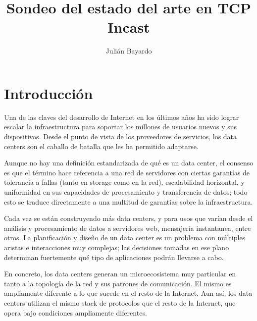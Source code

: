 \documentclass[runningheads,a4paper]{llncs}
\newcommand{\keywords}[1]{\par\addvspace\baselineskip
\noindent\keywordname\enspace\ignorespaces#1}
\begin{document}
\mainmatter  %

\title{Sondeo del estado del arte en TCP Incast}

\author{Julián Bayardo}


\maketitle



\section{Introducción}

Una de las claves del desarrollo de Internet en los últimos años ha sido lograr escalar la infraestructura para soportar los millones de usuarios nuevos y sus dispositivos. Desde el punto de vista de los proveedores de servicios, los data centers son el caballo de batalla que les ha permitido adaptarse.

Aunque no hay una definición estandarizada de qué es un data center, el consenso es que el término hace referencia a una red de servidores con ciertas garantías de tolerancia a fallas (tanto en storage como en la red), escalabilidad horizontal, y uniformidad en sus capacidades de procesamiento y transferencia de datos; todo esto se traduce directamente a una multitud de garantías sobre la infraestructura.

Cada vez se están construyendo más data centers, y para usos que varían desde el análisis y procesamiento de datos a servidores web, mensajería instantanea, entre otros. La planificación y diseño de un data center es un problema con múltiples aristas e interacciones muy complejas; las decisiones tomadas en ese plano determinan fuertemente qué tipo de aplicaciones podrán llevarse a cabo.

En concreto, los data centers generan un microecosistema muy particular en tanto a la topología de la red y sus patrones de comunicación. El mismo es ampliamente diferente a lo que sucede en el resto de la Internet. Aun así, los data centers utilizan el mismo stack de protocolos que el resto de la Internet, que opera bajo condiciones ampliamente diferentes. 
\end{document}
